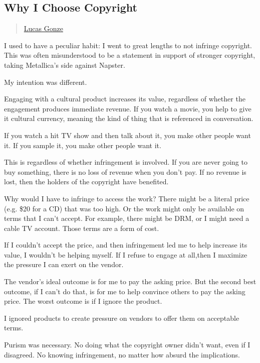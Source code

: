 \subsection{Why I Choose Copyright}\label{why-i-choose-copyright}

\begin{quote}
\hyperlink{lucas-gonze}{Lucas Gonze}
\end{quote}

I used to have a peculiar habit: I went to great lengths to not infringe
copyright. This was often misunderstood to be a statement in support of
stronger copyright, taking Metallica's side against Napster.

My intention was different.

Engaging with a cultural product increases its value, regardless of
whether the engagement produces immediate revenue. If you watch a movie,
you help to give it cultural currency, meaning the kind of thing that is
referenced in conversation.

If you watch a hit TV show and then talk about it, you make other people
want it. If you sample it, you make other people want it.

This is regardless of whether infringement is involved. If you are never
going to buy something, there is no loss of revenue when you don't pay.
If no revenue is lost, then the holders of the copyright have benefited.

Why would I have to infringe to access the work? There might be a
literal price (e.g. \$20 for a CD) that was too high. Or the work might
only be available on terms that I can't accept. For example, there might
be DRM, or I might need a cable TV account. Those terms are a form of
cost.

If I couldn't accept the price, and then infringement led me to help
increase its value, I wouldn't be helping myself. If I refuse to engage
at all,then I maximize the pressure I can exert on the vendor.

The vendor's ideal outcome is for me to pay the asking price. But the
second best outcome, if I can't do that, is for me to help convince
others to pay the asking price. The worst outcome is if I ignore the
product.

I ignored products to create pressure on vendors to offer them on
acceptable terms.

Purism was necessary. No doing what the copyright owner didn't want,
even if I disagreed. No knowing infringement, no matter how absurd the
implications.

